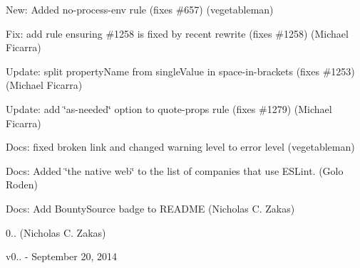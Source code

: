 \begin{DoxyItemize}
\item New\+: Added no-\/process-\/env rule (fixes \#657) (vegetableman)
\item Fix\+: add rule ensuring \#1258 is fixed by recent rewrite (fixes \#1258) (Michael Ficarra)
\item Update\+: split property\+Name from single\+Value in space-\/in-\/brackets (fixes \#1253) (Michael Ficarra)
\item Update\+: add \char`\"{}as-\/needed\char`\"{} option to quote-\/props rule (fixes \#1279) (Michael Ficarra)
\item Docs\+: fixed broken link and changed warning level to error level (vegetableman)
\item Docs\+: Added \char`\"{}the native web\char`\"{} to the list of companies that use E\+S\+Lint. (Golo Roden)
\item Docs\+: Add Bounty\+Source badge to R\+E\+A\+D\+ME (Nicholas C. Zakas)
\item 0.. (Nicholas C. Zakas)
\end{DoxyItemize}

v0.. -\/ September 20, 2014


